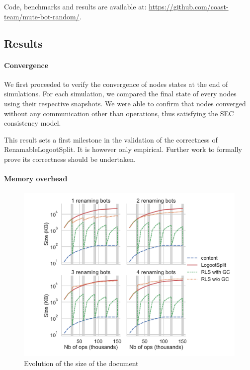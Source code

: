 \documentclass[10pt,journal,compsoc]{IEEEtran}
\let\MYoriglatexcaption\caption
\renewcommand{\caption}[2][\relax]{\MYoriglatexcaption[#2]{#2}}
\begin{document}
Code, benchmarks and results are available at: \url{https://github.com/coast-team/mute-bot-random/}.

\subsection{Results}

\paragraph{Convergence}

We first proceeded to verify the convergence of nodes states at the end of simulations.
For each simulation, we compared the final state of every nodes using their respective snapshots.
We were able to confirm that nodes converged without any communication other than operations, thus satisfying the \ac{SEC} consistency model.

This result sets a first milestone in the validation of the correctness of RenamableLogootSplit.
It is however only empirical.
Further work to formally prove its correctness should be undertaken.

\paragraph{Memory overhead}

\begin{figure}[t!]
    \centering
    \includegraphics[width=\columnwidth]{img/snapshot-sizes.pdf}
    \caption{Evolution of the size of the document}
    \label{fig:evolution-document-size}
\end{figure}
\end{document}
